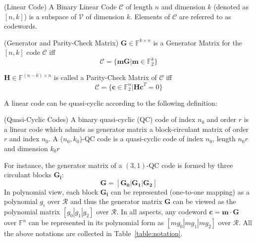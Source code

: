 \documentclass[runningheads]{llncs}
\begin{document}
\begin{definition}{(Linear Code)}
A Binary Linear Code $\mathcal{C}$ of length $n$ and dimension $k$ (denoted as $[n,k]$) is a subspace of $\mathcal{V}$ of dimension $k$. Elements of $\mathcal{C}$ are referred to as codewords.
\end{definition}

\begin{definition}{(Generator and Parity-Check Matrix)}
$\mathbf{G}\in \mathbb{F}^{k\times n}$ is a Generator Matrix for the $[n,k]$ code $\mathcal{C}$ iff
\[
\mathcal{C}=\{\mathbf{mG}|\mathbf{m}\in \mathbb{F}_2^k\}
\]

$\mathbf{H}\in \mathbb{F}^{(n-k)\times n}$ is called a Parity-Check Matrix of $\mathcal{C}$ iff
\[
\mathcal{C}=\{\mathbf{c} \in \mathbb{F}_2^n |\mathbf{Hc}^T=0\}
\]
\end{definition}
%
A linear code can be quasi-cyclic according to the following definition:

\begin{definition}{(Quasi-Cyclic Codes)}
A binary quasi-cyclic (QC) code of index $n_0$ and order $r$ is a linear code which admits as generator matrix a block-circulant matrix of order $r$ and index $n_0$.
A ($n_0,k_0$)-QC code is a quasi-cyclic code of index $n_0$, length $n_0r$ and dimension $k_0r$
\end{definition}
%
For instance, the generator matrix of a $(3,1)$-QC code is formed by three circulant blocks $\mathbf{G_i}$:
\[
\mathbf{G}=[\mathbf{G_0}|\mathbf{G_1}|\mathbf{G_2}]
\]
In polynomial view, each block $\mathbf{G_i}$ can be represented (one-to-one mapping) as a polynomial $g_i$ over $\mathcal{R}$ and thus the generator matrix $\mathbf{G}$ can be viewed as the polynomial matrix $[g_0|g_1|g_2]$ over $\mathcal{R}$. In all aspects, any codeword $\mathbf{c}=\mathbf{m}\cdot\mathbf{G}$ over $\mathbb{F}^{n}$ can be represented in its polynomial form as $[mg_0|mg_1|mg_2]$ over $\mathcal{R}$. All the above notations are collected in
Table~\ref{table:notation}.
\end{document}
